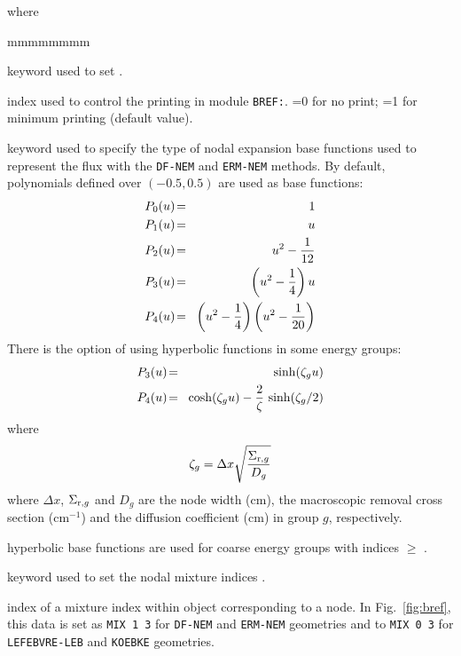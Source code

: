 \noindent where
\begin{ListeDeDescription}{mmmmmmmm}

\item[\moc{EDIT}] keyword used to set .

\item[\dusa{iprint}] index used to control the printing in module {\tt BREF:}. =0 for no print; =1 for minimum printing (default value).

\item[\moc{HYPE}] keyword used to specify the type of nodal expansion base functions used to represent the flux with the {\tt DF-NEM} and {\tt ERM-NEM}
methods. By default, polynomials defined over $(-0.5,0.5)$ are used as base functions:
\begin{eqnarray}
\nonumber P_0(u)\negthinspace &=&\negthinspace 1\\
\nonumber P_1(u)\negthinspace &=&\negthinspace u\\
\nonumber P_2(u)\negthinspace &=&\negthinspace u^2-{1\over 12}\\
\nonumber P_3(u)\negthinspace &=&\negthinspace \left( u^2-{1\over 4}\right)u\\
P_4(u)\negthinspace &=&\negthinspace \left( u^2-{1\over 4}\right)\left( u^2-{1\over 20}\right)
\end{eqnarray}
There is the option of using hyperbolic functions in some energy groups:
\begin{eqnarray}
\nonumber P_3(u)\negthinspace &=&\negthinspace \sinh(\zeta_g u)\\
P_4(u)\negthinspace &=&\negthinspace \cosh(\zeta_g u)-{2\over \zeta}\, \sinh(\zeta_g/2)
\end{eqnarray}
\noindent where
\begin{equation}
\zeta_g=\Delta x\sqrt{\Sigma_{{\rm r},g} \over D_g}
\end{equation}
\noindent where $\Delta x$, $\Sigma_{{\rm r},g}$ and $D_g$ are the node width (cm), the macroscopic removal cross section (cm$^{-1}$)
and the diffusion coefficient (cm) in group $g$, respectively.

\item[\dusa{igmax}] hyperbolic base functions are used for coarse energy groups with indices $\ge$ .

\item[\moc{MIX}] keyword used to set the nodal mixture indices .

\item[\dusa{imix}] index of a mixture index within object  corresponding to a node. In Fig.~\ref{fig:bref}, this data
is set as {\tt MIX 1 3} for {\tt DF-NEM} and {\tt ERM-NEM} geometries and to {\tt MIX 0 3} for {\tt LEFEBVRE-LEB} and {\tt KOEBKE}
geometries.


\end{ListeDeDescription}
